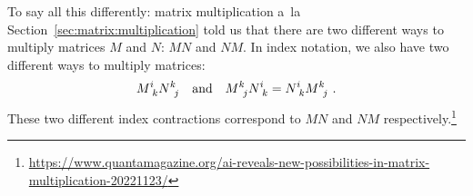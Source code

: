 \documentclass[12pt, oneside]{report}    %
\begin{document}
To say all this differently: matrix multiplication a~la  Section~\ref{sec:matrix:multiplication} told us that there are two different ways to multiply matrices $M$ and $N$: $MN$ and $NM$. In index notation, we also have two different ways to multiply matrices:
\begin{align}
    M\aij{i}{k}N\aij{k}{j}
    &&\text{and}&&
    M\aij{k}{j}N\aij{i}{k} = N\aij{i}{k}M\aij{k}{j} \ .
\end{align}
These two different index contractions correspond to $MN$ and $NM$ respectively.\footnote{\url{https://www.quantamagazine.org/ai-reveals-new-possibilities-in-matrix-multiplication-20221123/}}
\end{document}
